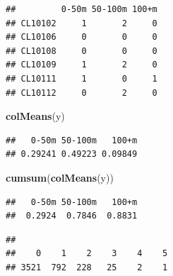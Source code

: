 \documentclass[12pt,]{book}
\newenvironment{Shaded}{\begin{snugshade}}{\end{snugshade}}
\newcommand{\DataTypeTok}[1]{\textcolor[rgb]{0.13,0.29,0.53}{#1}}
\newcommand{\KeywordTok}[1]{\textcolor[rgb]{0.13,0.29,0.53}{\textbf{#1}}}
\newcommand{\NormalTok}[1]{#1}
\newcommand{\OperatorTok}[1]{\textcolor[rgb]{0.81,0.36,0.00}{\textbf{#1}}}
\newcommand{\StringTok}[1]{\textcolor[rgb]{0.31,0.60,0.02}{#1}}
\begin{document}
\begin{verbatim}
##         0-50m 50-100m 100+m
## CL10102     1       2     0
## CL10106     0       0     0
## CL10108     0       0     0
## CL10109     1       2     0
## CL10111     1       0     1
## CL10112     0       2     0
\end{verbatim}

\begin{Shaded}
\begin{Highlighting}[]
\KeywordTok{colMeans}\NormalTok{(y)}
\end{Highlighting}
\end{Shaded}

\begin{verbatim}
##   0-50m 50-100m   100+m 
## 0.29241 0.49223 0.09849
\end{verbatim}

\begin{Shaded}
\begin{Highlighting}[]
\KeywordTok{cumsum}\NormalTok{(}\KeywordTok{colMeans}\NormalTok{(y))}
\end{Highlighting}
\end{Shaded}

\begin{verbatim}
##   0-50m 50-100m   100+m 
##  0.2924  0.7846  0.8831
\end{verbatim}

\begin{Shaded}
\end{Shaded}

\begin{verbatim}
## 
##    0    1    2    3    4    5 
## 3521  792  228   25    2    1
\end{verbatim}

\begin{Shaded}
\end{Shaded}
\end{document}
